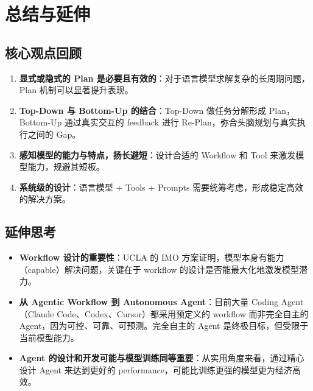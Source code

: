 \section{总结与延伸}

\subsection{核心观点回顾}

\begin{enumerate}
    \item \textbf{显式或隐式的 Plan 是必要且有效的}：对于语言模型求解复杂的长周期问题，Plan 机制可以显著提升表现。
    \item \textbf{Top-Down 与 Bottom-Up 的结合}：Top-Down 做任务分解形成 Plan，Bottom-Up 通过真实交互的 feedback 进行 Re-Plan，弥合头脑规划与真实执行之间的 Gap。
    \item \textbf{感知模型的能力与特点，扬长避短}：设计合适的 Workflow 和 Tool 来激发模型能力，规避其短板。
    \item \textbf{系统级的设计}：语言模型 + Tools + Prompts 需要统筹考虑，形成稳定高效的解决方案。
\end{enumerate}

\subsection{延伸思考}

\begin{itemize}
    \item \textbf{Workflow 设计的重要性}：UCLA 的 IMO 方案证明，模型本身有能力（capable）解决问题，关键在于 workflow 的设计是否能最大化地激发模型潜力。
    \item \textbf{从 Agentic Workflow 到 Autonomous Agent}：目前大量 Coding Agent（Claude Code、Codex、Cursor）都采用预定义的 workflow 而非完全自主的 Agent，因为可控、可靠、可预测。完全自主的 Agent 是终极目标，但受限于当前模型能力。
    \item \textbf{Agent 的设计和开发可能与模型训练同等重要}：从实用角度来看，通过精心设计 Agent 来达到更好的 performance，可能比训练更强的模型更为经济高效。
\end{itemize}



